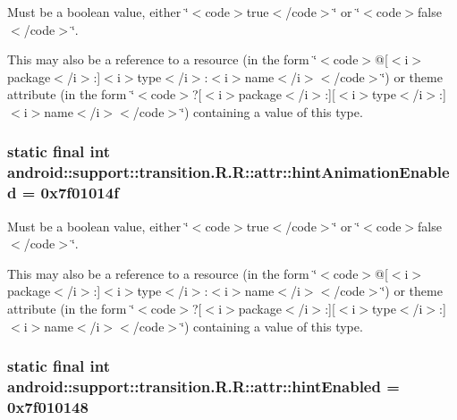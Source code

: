 Must be a boolean value, either \char`\"{}$<$code$>$true$<$/code$>$\char`\"{} or \char`\"{}$<$code$>$false$<$/code$>$\char`\"{}. 

This may also be a reference to a resource (in the form \char`\"{}$<$code$>$@\mbox{[}$<$i$>$package$<$/i$>$:\mbox{]}$<$i$>$type$<$/i$>$:$<$i$>$name$<$/i$>$$<$/code$>$\char`\"{}) or theme attribute (in the form \char`\"{}$<$code$>$?\mbox{[}$<$i$>$package$<$/i$>$:\mbox{]}\mbox{[}$<$i$>$type$<$/i$>$:\mbox{]}$<$i$>$name$<$/i$>$$<$/code$>$\char`\"{}) containing a value of this type. \hypertarget{classandroid_1_1support_1_1transition_1_1_r_1_1attr_ee249811c616d41df1099fa88924810c}{
\subsubsection[{hintAnimationEnabled}]{\setlength{\rightskip}{0pt plus 5cm}static final int android::support::transition.R.R::attr::hintAnimationEnabled = 0x7f01014f}}
\label{classandroid_1_1support_1_1transition_1_1_r_1_1attr_ee249811c616d41df1099fa88924810c}


Must be a boolean value, either \char`\"{}$<$code$>$true$<$/code$>$\char`\"{} or \char`\"{}$<$code$>$false$<$/code$>$\char`\"{}. 

This may also be a reference to a resource (in the form \char`\"{}$<$code$>$@\mbox{[}$<$i$>$package$<$/i$>$:\mbox{]}$<$i$>$type$<$/i$>$:$<$i$>$name$<$/i$>$$<$/code$>$\char`\"{}) or theme attribute (in the form \char`\"{}$<$code$>$?\mbox{[}$<$i$>$package$<$/i$>$:\mbox{]}\mbox{[}$<$i$>$type$<$/i$>$:\mbox{]}$<$i$>$name$<$/i$>$$<$/code$>$\char`\"{}) containing a value of this type. \hypertarget{classandroid_1_1support_1_1transition_1_1_r_1_1attr_4807be9470373162b3362616bd13dd1b}{
\subsubsection[{hintEnabled}]{\setlength{\rightskip}{0pt plus 5cm}static final int android::support::transition.R.R::attr::hintEnabled = 0x7f010148}}
\label{classandroid_1_1support_1_1transition_1_1_r_1_1attr_4807be9470373162b3362616bd13dd1b}



